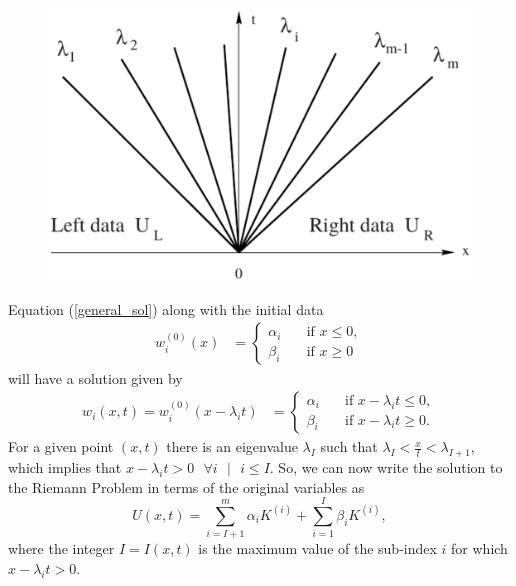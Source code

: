 \documentclass[]{article}
\begin{document}
		\begin{figure}[h] 	
			\centering
			\includegraphics[scale=.30]{CharacteristicFanRP}
			\caption{}
			\label{CharacteristicFanRP}
		\end{figure} 
		Equation (\ref{general_sol}) along with the initial data
		\begin{equation}
	    	\begin{aligned}
			w^{(0)}_i(x) &= \left\{
			\begin{array}{ll}
			\alpha_i & \quad \mbox{if } x \leq 0, \\
			\beta_i & \quad \mbox{if } x \geq 0
			\end{array}
			\right.
			\end{aligned}
		\end{equation}
		will have a solution given by
		\begin{equation}	    \begin{aligned}
			w_i(x,t) = w^{(0)}_i(x - \lambda_i t) &= \left\{
			\begin{array}{ll}
			\alpha_i & \quad \mbox{if } x - \lambda_i t \leq 0, \\
			\beta_i & \quad \mbox{if } x - \lambda_i t \geq 0.
			\end{array}
			\right.					
			\end{aligned}
		\end{equation}
		For a given point $ (x,t)$ there is an eigenvalue $ \lambda_I $ such that $ \lambda_I <\frac{x}{t}<\lambda_{I+1}$, which implies that $ x - \lambda_i t>0 \mbox{ } \forall i \mbox{ }| \mbox{ } i \leq I$. So, we can now write the solution to the Riemann Problem in terms of the original variables as 
		\begin{equation}
			U(x,t) = \sum_{i = I+1}^{m} \alpha_i K^{(i)} + \sum_{i = 1}^{I} \beta_i K^{(i)},
		\end{equation}where the integer $ I = I(x,t) $ is the maximum value of the sub-index $ i $ for which $ x - \lambda_i t > 0 $.
\end{document}
